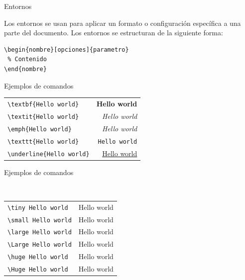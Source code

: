 \begin{frame}[fragile]{Entornos}

Los entornos se usan para aplicar un formato o configuración específica a una
parte del documento. Los entornos se estructuran de la siguiente forma:

\begin{lstlisting}
\begin{nombre}[opciones]{parametro}
 % Contenido
\end{nombre}
\end{lstlisting}

\end{frame}

\begin{frame}{Ejemplos de comandos}

\begin{center}
\begin{tabular}{lr}
  \texttt{\textbackslash textbf\{Hello world\}} & \textbf{Hello world} \\[3mm]
  \texttt{\textbackslash textit\{Hello world\}} & \textit{Hello world} \\[3mm]
  \texttt{\textbackslash emph\{Hello world\}} & \emph{Hello world} \\[3mm]
  \texttt{\textbackslash texttt\{Hello world\}} & \texttt{Hello world} \\[3mm]
  \texttt{\textbackslash underline\{Hello world\}} & \underline{Hello world} \\[3mm]
\end{tabular}
\end{center}

\end{frame}

\begin{frame}{Ejemplos de comandos}
\begin{center}
\color{red}\color{black}\\[5mm]

\begin{tabular}{lr}
  \texttt{\textbackslash tiny Hello world} & \tiny Hello world \\
  \texttt{\textbackslash small Hello world} & \small Hello world \\
  \texttt{\textbackslash large Hello world} & \large Hello world \\
  \texttt{\textbackslash Large Hello world} & \Large Hello world \\
  \texttt{\textbackslash huge Hello world} & \huge Hello world \\
  \texttt{\textbackslash Huge Hello world} & \Huge Hello world
\end{tabular}
\end{center}
\end{frame}

